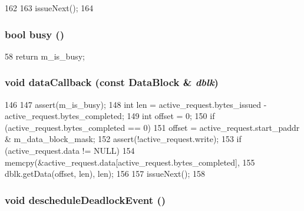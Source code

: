\begin{DoxyCode}
162 {
163     issueNext();
164 }
\end{DoxyCode}
\hypertarget{classDMASequencer_ae95edfbb78f3030b37041e8051eac019}{
\subsubsection[{busy}]{\setlength{\rightskip}{0pt plus 5cm}bool busy ()}}
\label{classDMASequencer_ae95edfbb78f3030b37041e8051eac019}



\begin{DoxyCode}
58 { return m_is_busy;}
\end{DoxyCode}
\hypertarget{classDMASequencer_a09bba33767295e37f13886dd74b72d23}{
\subsubsection[{dataCallback}]{\setlength{\rightskip}{0pt plus 5cm}void dataCallback (const {\bf DataBlock} \& {\em dblk})}}
\label{classDMASequencer_a09bba33767295e37f13886dd74b72d23}



\begin{DoxyCode}
146 {
147     assert(m_is_busy);
148     int len = active_request.bytes_issued - active_request.bytes_completed;
149     int offset = 0;
150     if (active_request.bytes_completed == 0)
151         offset = active_request.start_paddr & m_data_block_mask;
152     assert(!active_request.write);
153     if (active_request.data != NULL) {
154         memcpy(&active_request.data[active_request.bytes_completed],
155                dblk.getData(offset, len), len);
156     }
157     issueNext();
158 }
\end{DoxyCode}
\hypertarget{classDMASequencer_a7c9a8861621a62055761f47310814762}{
\subsubsection[{descheduleDeadlockEvent}]{\setlength{\rightskip}{0pt plus 5cm}void descheduleDeadlockEvent ()}}
\label{classDMASequencer_a7c9a8861621a62055761f47310814762}


